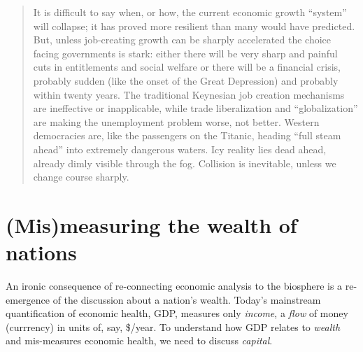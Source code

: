 \begin{quote}
	It is difficult to say when, or how, the current economic growth ``system'' will collapse;
	it has proved more resilient than many would have predicted. 
	But, unless job-creating growth can be sharply accelerated 
	the choice facing governments is stark: 
	either there will be very sharp and painful cuts 
	in entitlements and social welfare or there will be a financial crisis,
	probably sudden (like the onset of the Great Depression) and probably within twenty years. 
	The traditional Keynesian job creation mechanisms are ineffective or inapplicable, 
	while trade liberalization and ``globalization'' 
	are making the unemployment problem worse, not better.
	Western democracies are, 
	like the passengers on the Titanic, 
	heading ``full steam ahead'' into
	extremely dangerous waters. 
	Icy reality lies dead ahead, 
	already dimly visible through the fog.
	Collision is inevitable, 
	unless we change course sharply.\cite{Ayres:1996aa}
\end{quote}




\section{(Mis)measuring the wealth of nations}
\label{sec:wealth_nations}

An ironic consequence of re-connecting economic analysis to the biosphere is a 
re-emergence of the discussion about a nation's wealth. 
Today's mainstream quantification of economic health, GDP, 
measures only \emph{income}, a \emph{flow} of money (currrency) in units 
of, say, \$/year.  
To understand how GDP relates to \emph{wealth} and mis-measures economic health, 
we need to discuss \emph{capital}.


